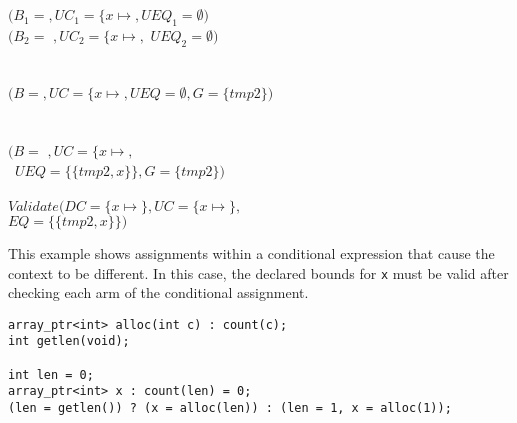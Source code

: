 \begin{small}
\begin{tabbing}
\>\>\\
\>\>\\
\>\>\>\>$(B_1 = $$, \mathit{UC}_1 = \{x\mapsto$$,
                {UEQ}_1 = \emptyset)$\\
\>\>\>\>$(B_2 = $ $, \mathit{UC}_2 = \{x\mapsto$$,$
               ${UEQ}_2 = \emptyset)$\\
\\
\>\>\\
\>\>\>\>$(B = $$, \mathit{UC} = \{x\mapsto$$,
                UEQ = \emptyset, G = \{ tmp2 \})$\\
\\
\>\>\\
\>\>\>$(B = $ $, \mathit{UC} = \{x\mapsto$$,$\\
\>\>\>\>~$UEQ = \{\{tmp2, x\}\}, G = \{tmp2 \})$\\
\\
\>\>$Validate(DC = \{x \mapsto$$\},
                   \mathit{UC} = \{x\mapsto $$\},$\\
\>\>\>\>\>\>$EQ = \{\{tmp2, x\}\})$\\
\end{tabbing}
\end{small}

This example shows assignments within a conditional expression that cause the context to be
different.  In this case, the declared bounds for \lstinline+x+ must be valid after checking each arm
of the conditional  assignment.
\begin{lstlisting}
array_ptr<int> alloc(int c) : count(c);
int getlen(void);

int len = 0;
array_ptr<int> x : count(len) = 0;
(len = getlen()) ? (x = alloc(len)) : (len = 1, x = alloc(1));
\end{lstlisting}

